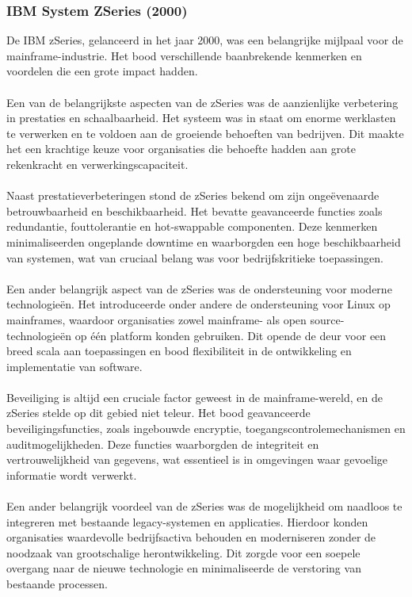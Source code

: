 \subsubsection{IBM System ZSeries (2000)}
\label{sec:IBM System zSeries}
De IBM zSeries, gelanceerd in het jaar 2000, was een belangrijke mijlpaal voor de mainframe-industrie. Het bood verschillende baanbrekende kenmerken en voordelen die een grote impact hadden.
\\
\\
Een van de belangrijkste aspecten van de zSeries was de aanzienlijke verbetering in prestaties en schaalbaarheid. Het systeem was in staat om enorme werklasten te verwerken en te voldoen aan de groeiende behoeften van bedrijven. Dit maakte het een krachtige keuze voor organisaties die behoefte hadden aan grote rekenkracht en verwerkingscapaciteit. \autocite{IBM}
\\
\\
Naast prestatieverbeteringen stond de zSeries bekend om zijn ongeëvenaarde betrouwbaarheid en beschikbaarheid. Het bevatte geavanceerde functies zoals redundantie, fouttolerantie en hot-swappable componenten. Deze kenmerken minimaliseerden ongeplande downtime en waarborgden een hoge beschikbaarheid van systemen, wat van cruciaal belang was voor bedrijfskritieke toepassingen. \autocite{IBM}
\\
\\
Een ander belangrijk aspect van de zSeries was de ondersteuning voor moderne technologieën. Het introduceerde onder andere de ondersteuning voor Linux op mainframes, waardoor organisaties zowel mainframe- als open source-technologieën op één platform konden gebruiken. Dit opende de deur voor een breed scala aan toepassingen en bood flexibiliteit in de ontwikkeling en implementatie van software. \autocite{IBM}
\\
\\
Beveiliging is altijd een cruciale factor geweest in de mainframe-wereld, en de zSeries stelde op dit gebied niet teleur. Het bood geavanceerde beveiligingsfuncties, zoals ingebouwde encryptie, toegangscontrolemechanismen en auditmogelijkheden. Deze functies waarborgden de integriteit en vertrouwelijkheid van gegevens, wat essentieel is in omgevingen waar gevoelige informatie wordt verwerkt. \autocite{Goldberg2020}
\\
\\
Een ander belangrijk voordeel van de zSeries was de mogelijkheid om naadloos te integreren met bestaande legacy-systemen en applicaties. Hierdoor konden organisaties waardevolle bedrijfsactiva behouden en moderniseren zonder de noodzaak van grootschalige herontwikkeling. Dit zorgde voor een soepele overgang naar de nieuwe technologie en minimaliseerde de verstoring van bestaande processen. \autocite{Goldberg2020}
\\
\\

